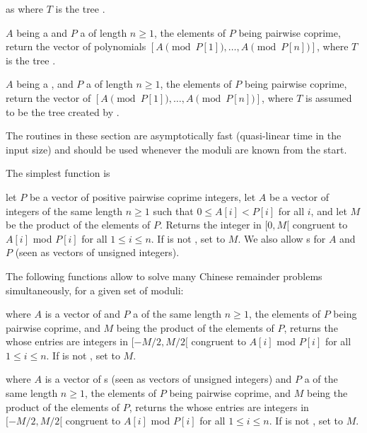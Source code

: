 as  where $T$ is the tree .

 $A$ being a 
and $P$ a  of length $n\ge 1$, the elements of $P$ being
pairwise coprime, return the vector of  polynomials
$[A \pmod{P[1]},\ldots,A \pmod{P[n]}]$,
where $T$ is the tree .

 $A$ being a ,
and $P$ a  of length $n\ge 1$, the elements of $P$ being
pairwise coprime, return the vector of 
$[A \pmod{P[1]},\ldots,A \pmod{P[n]}]$,
where $T$ is assumed to be the tree created by .

\medskip

The routines in these section are asymptotically fast (quasi-linear time in
the input size) and should be used whenever the moduli are known from
the start.

The simplest function is

let $P$ be a vector of positive pairwise coprime integers, let $A$ be a
vector of integers of the same length $n\ge 1$ such that $0 \leq A[i] < P[i]$
for all $i$, and let $M$ be the product of the elements of $P$. Returns the
integer in $[0, M[$ congruent to $A[i]$ mod $P[i]$ for all $1\leq i\leq n$.
If  is not , set  to $M$. We also allow
s for $A$ and $P$ (seen as vectors of unsigned integers).

The following functions allow to solve many Chinese remainder problems
simultaneously, for a given set of moduli:

where $A$ is a vector of 
and $P$ a  of the same length $n\ge 1$, the elements of $P$
being pairwise coprime, and $M$ being the product of the elements of $P$,
returns the  whose entries are integers in $[-M/2, M/2[$ congruent to $A[i]$
mod $P[i]$ for all $1\leq i\leq n$.
If  is not , set  to $M$.

 where $A$ is a
vector of s (seen as vectors of unsigned integers) and $P$ a
 of the same length $n\ge 1$, the elements of $P$ being
pairwise coprime, and $M$ being the product of the elements of $P$, returns
the  whose entries are integers in $[-M/2, M/2[$ congruent to $A[i]$
mod $P[i]$ for all $1\leq i\leq n$. If  is not , set
 to $M$.

